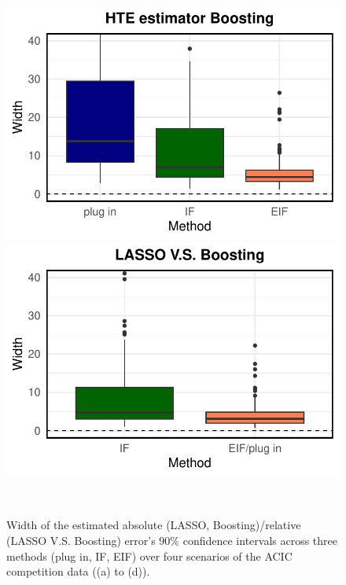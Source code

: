 \begin{figure}[ht]
\begin{minipage}{0.3\textwidth}
                \includegraphics[clip, trim = 0cm 0cm 0cm 0cm, width = \textwidth]{plot/ACIC_nonlinear_propensity_nonlinear_HTE_CI_width_Boosting.pdf}
        \end{minipage}
        \begin{minipage}{0.3\textwidth}
                \centering
                \includegraphics[clip, trim = 0cm 0cm 0cm 0cm, width = \textwidth]{plot/ACIC_nonlinear_propensity_nonlinear_HTE_CI_width_LASSO_V.S._Boosting.pdf}
        \end{minipage}        
         \\
        \caption{
        Width of the estimated absolute (LASSO, Boosting)/relative (LASSO V.S. Boosting) error's $90\%$ confidence intervals across three methods (plug in, IF, EIF) over four scenarios of the ACIC competition data ((a) to (d)). 
        }
    \label{fig:ACIC.width}
\end{figure}


